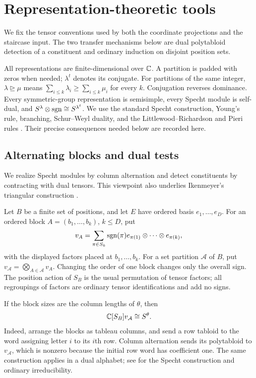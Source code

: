 \section{Representation-theoretic tools}
\label{sec:prelim}

We fix the tensor conventions used by both the coordinate projections
and the staircase input. The two transfer mechanisms below are dual
polytabloid detection of a constituent and ordinary induction on disjoint
position sets.

All representations are finite-dimensional over $\mathbb C$. A partition is
padded with zeros when needed; $\lambda^t$ denotes its conjugate.
For partitions of the same integer, $\lambda\unrhd\mu$ means
$\sum_{i\le k}\lambda_i\ge\sum_{i\le k}\mu_i$ for every $k$.
Conjugation reverses dominance. Every symmetric-group representation
is semisimple, every Specht module is self-dual, and
$S^\lambda\otimes\operatorname{sgn}\cong S^{\lambda^t}$.
We use the standard Specht construction, Young's rule, branching,
Schur--Weyl duality, and the Littlewood--Richardson and Pieri rules
\cite{James,FultonHarris,Macdonald}.
Their precise consequences needed below are recorded here.

\subsection{Alternating blocks and dual tests}

We realize Specht modules by column alternation and detect constituents
by contracting with dual tensors. This viewpoint also underlies
Ikenmeyer's triangular construction \cite[Sections~3--5]{Ikenmeyer}.

Let $B$ be a finite set of positions, and let $E$ have ordered basis
$e_1,\ldots,e_D$. For an ordered block $A=(b_1,\ldots,b_k)$, $k\le D$,
put
\[
 v_A=\sum_{\pi\in S_k}\operatorname{sgn}(\pi)
       e_{\pi(1)}\otimes\cdots\otimes e_{\pi(k)},
\]
with the displayed factors placed at $b_1,\ldots,b_k$.
For a set partition $\mathcal A$ of $B$, put
$v_{\mathcal A}=\bigotimes_{A\in\mathcal A}v_A$.
Changing the order of one block changes only the overall sign.
The position action of $S_B$ is the usual permutation of tensor factors;
all regroupings of factors are ordinary tensor identifications and add
no signs.

If the block sizes are the column lengths of $\theta$, then
\begin{equation}\label{eq:block-specht}
 \mathbb C[S_B]v_{\mathcal A}\cong S^\theta.
\end{equation}
Indeed, arrange the blocks as tableau columns, and send a row tabloid
to the word assigning letter $i$ to its $i$th row. Column alternation
sends its polytabloid to $v_{\mathcal A}$, which is nonzero because the
initial row word has coefficient one. The same construction applies
in a dual alphabet; see \cite[Definitions~4.1 and~4.3,
Theorem~4.12]{James} for the Specht construction and ordinary
irreducibility.

